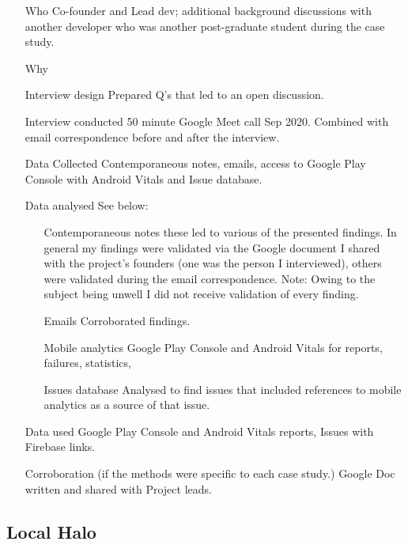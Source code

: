 \begin{itemize}
    \item[Who] Co-founder and Lead dev; additional background discussions with another developer who was another post-graduate student during the case study. 
    \item[Why]
    \item[Interview design] Prepared Q's that led to an open discussion.
    \item[Interview conducted] 50 minute Google Meet call  Sep 2020. Combined with email correspondence  before and after the interview.
    \item[Data Collected] Contemporaneous notes, emails, access to Google Play Console with Android  Vitals and Issue database.
    \item[Data analysed] See below:
    \begin{itemize}
        \item[Contemporaneous notes] these led to various of the presented findings. In general my findings were validated via the Google document I shared with the project's founders (one was the person I interviewed), others were validated during the email correspondence. Note: Owing to the subject being unwell I did not receive validation of every finding. 
        \item[Emails] Corroborated findings.
        \item[Mobile analytics] Google Play Console and Android Vitals for reports, failures, statistics,
        \item[Issues database] Analysed to find issues that included references to mobile analytics as a source of that issue.
    \end{itemize}
    \item[Data used] Google Play Console and Android Vitals reports, Issues with Firebase links.
    \item[Corroboration] (if the methods were specific to each case study.) Google Doc written and shared with Project leads.
\end{itemize}

\subsection{Local Halo}


